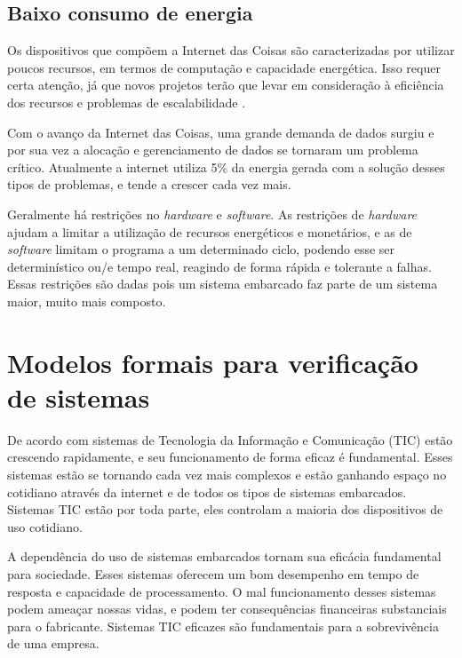 
\subsection{Baixo consumo de energia}
Os dispositivos que compõem a Internet das Coisas são caracterizadas por utilizar poucos recursos, em termos de computação e capacidade energética. Isso requer certa atenção, já que novos projetos terão que levar em consideração à eficiência dos recursos e problemas de escalabilidade \cite{atzori2010internet}.

Com o avanço da Internet das Coisas, uma grande demanda de dados surgiu e por sua vez a alocação e gerenciamento de dados se tornaram um problema crítico. Atualmente a internet utiliza 5\% da energia gerada com a solução desses tipos de problemas, e tende a crescer cada vez mais.\cite{Gubbi:2013} 

Geralmente há restrições no \textit{hardware} e \textit{software}. As restrições de \textit{hardware} ajudam a limitar a utilização de recursos energéticos e monetários, e as de \textit{software} limitam o programa a um determinado ciclo, podendo esse ser determinístico ou/e tempo real, reagindo de forma rápida e tolerante a falhas. Essas restrições são dadas pois um sistema embarcado faz parte de um sistema maior, muito mais composto. %

\section{Modelos formais para verificação de sistemas}
 
De acordo com  sistemas de Tecnologia da Informação e Comunicação (TIC) estão crescendo rapidamente, e seu funcionamento de forma eficaz é fundamental. Esses sistemas estão se tornando cada vez mais complexos e estão ganhando espaço no cotidiano através da internet e de todos os tipos de sistemas embarcados. Sistemas TIC estão por toda parte, eles controlam a maioria dos dispositivos de uso cotidiano.

A dependência do uso de sistemas embarcados tornam sua eficácia fundamental para sociedade. Esses sistemas oferecem um bom desempenho em tempo de resposta e capacidade de processamento. O mal funcionamento desses sistemas podem ameaçar nossas vidas, e podem ter consequências financeiras substanciais para o fabricante. Sistemas TIC eficazes são fundamentais para a sobrevivência de uma empresa.

